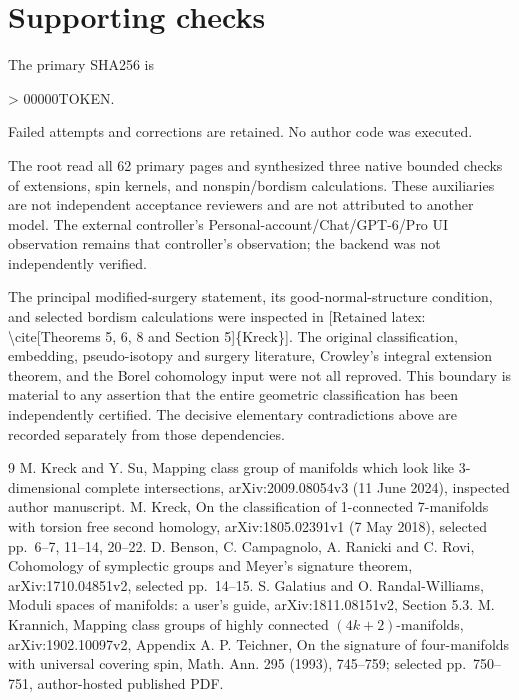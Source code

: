 \documentclass[10pt]{article}
\begin{document}
\section*{Supporting checks}
The primary SHA256 is\par
> 00000TOKEN.\par
Failed attempts and corrections are retained. No author code was executed.\par
The root read all 62 primary pages and synthesized three native bounded checks of extensions, spin kernels, and nonspin/bordism calculations. These auxiliaries are not independent acceptance reviewers and are not attributed to another model. The external controller’s Personal-account/Chat/GPT-6/Pro UI observation remains that controller’s observation; the backend was not independently verified.\par
The principal modified-surgery statement, its good-normal-structure condition, and selected bordism calculations were inspected in [Retained latex: \textbackslash{}cite[Theorems 5, 6, 8 and Section 5]\{Kreck\}]. The original classification, embedding, pseudo-isotopy and surgery literature, Crowley’s integral extension theorem, and the Borel cohomology input were not all reproved. This boundary is material to any assertion that the entire geometric classification has been independently certified. The decisive elementary contradictions above are recorded separately from those dependencies.\par
9 M. Kreck and Y. Su, Mapping class group of manifolds which look like 3-dimensional complete intersections, arXiv:2009.08054v3 (11 June 2024), inspected author manuscript. M. Kreck, On the classification of 1-connected 7-manifolds with torsion free second homology, arXiv:1805.02391v1 (7 May 2018), selected pp. 6–7, 11–14, 20–22. D. Benson, C. Campagnolo, A. Ranicki and C. Rovi, Cohomology of symplectic groups and Meyer’s signature theorem, arXiv:1710.04851v2, selected pp. 14–15. S. Galatius and O. Randal-Williams, Moduli spaces of manifolds: a user’s guide, arXiv:1811.08151v2, Section 5.3. M. Krannich, Mapping class groups of highly connected \((4k+2)\)-manifolds, arXiv:1902.10097v2, Appendix A. P. Teichner, On the signature of four-manifolds with universal covering spin, Math. Ann. 295 (1993), 745–759; selected pp. 750–751, author-hosted published PDF.\par
\end{document}
